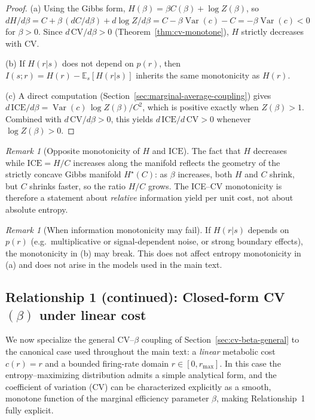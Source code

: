 \documentclass[11pt]{article}
\DeclareMathOperator{\Var}{Var}
\newcommand{\EE}{\mathbb{E}}
\theoremstyle{remark}
\newtheorem{remark}[theorem]{Remark}
\theoremstyle{definition}
\begin{document}
\begin{proof}
(a) Using the Gibbs form, $H(\beta)=\beta C(\beta)+\log Z(\beta)$, so
\(
dH/d\beta = C + \beta\,(dC/d\beta) + d\log Z/d\beta = C - \beta\Var(c) - C = -\beta\Var(c) < 0
\)
for $\beta>0$.  Since $d\,\mathrm{CV}/d\beta>0$ (Theorem~\ref{thm:cv-monotone}), $H$ strictly decreases with $\mathrm{CV}$.

(b) If $H(r|s)$ does not depend on $p(r)$, then $I(s;r)=H(r)-\EE_s[H(r|s)]$ inherits the same monotonicity as $H(r)$.

(c) A direct computation (Section~\ref{sec:marginal-average-coupling}) gives
$d\,\mathrm{ICE}/d\beta = \Var(c)\,\log Z(\beta)/C^2$, which is positive exactly when $Z(\beta)>1$.  Combined with $d\,\mathrm{CV}/d\beta>0$, this yields $d\,\mathrm{ICE}/d\,\mathrm{CV}>0$ whenever $\log Z(\beta)>0$.
\end{proof}

\begin{remark}[Opposite monotonicity of $H$ and $\mathrm{ICE}$]
The fact that $H$ decreases while $\mathrm{ICE}=H/C$ increases along the manifold reflects the geometry of the strictly concave Gibbs manifold $H^\star(C)$: as $\beta$ increases, both $H$ and $C$ shrink, but $C$ shrinks faster, so the ratio $H/C$ grows.  The ICE--CV monotonicity is therefore a statement about \emph{relative} information yield per unit cost, not about absolute entropy.
\end{remark}

\begin{remark}[When information monotonicity may fail]
If $H(r|s)$ depends on $p(r)$ (e.g.\ multiplicative or signal-dependent noise, or strong boundary effects), the monotonicity in (b) may break.  This does not affect entropy monotonicity in (a) and does not arise in the models used in the main text.
\end{remark}

\subsection{Relationship 1 (continued): Closed-form CV$(\beta)$ under linear cost}
\label{sec:cv-beta-linear}

We now specialize the general CV--$\beta$ coupling of Section~\ref{sec:cv-beta-general} to the canonical case used throughout the main text: a
\emph{linear} metabolic cost $c(r)=r$ and a bounded firing-rate domain
$r\in[0,r_{\max}]$.  In this case the entropy--maximizing distribution
admits a simple analytical form, and the coefficient of variation (CV)
can be characterized explicitly as a smooth, monotone function of the
marginal efficiency parameter $\beta$, making Relationship~1 fully explicit.
\end{document}
